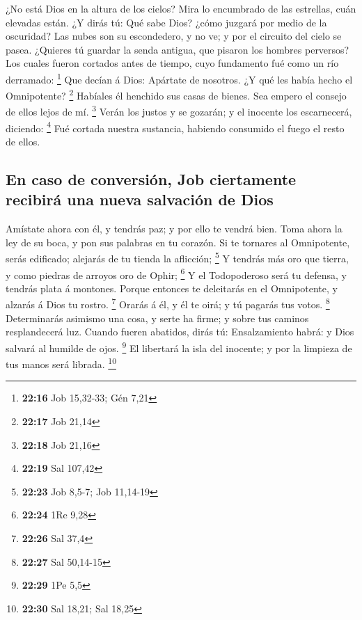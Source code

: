  ¿No está Dios en la altura de los cielos? Mira lo
encumbrado de las estrellas, cuán elevadas están.  ¿Y dirás
tú: Qué sabe Dios? ¿cómo juzgará por medio de la oscuridad?
 Las nubes son su escondedero, y no ve; y por el circuito
del cielo se pasea.  ¿Quieres tú guardar la senda antigua,
que pisaron los hombres perversos?  Los cuales fueron
cortados antes de tiempo, cuyo fundamento fué como un río derramado:
\footnote{\textbf{22:16} Job 15,32-33; Gén 7,21}  Que
decían á Dios: Apártate de nosotros. ¿Y qué les había hecho el
Omnipotente? \footnote{\textbf{22:17} Job 21,14}  Habíales
él henchido sus casas de bienes. Sea empero el consejo de ellos lejos de
mí. \footnote{\textbf{22:18} Job 21,16}  Verán los justos y
se gozarán; y el inocente los escarnecerá, diciendo: \footnote{\textbf{22:19}
  Sal 107,42}  Fué cortada nuestra sustancia, habiendo
consumido el fuego el resto de ellos.

\hypertarget{en-caso-de-conversiuxf3n-job-ciertamente-recibiruxe1-una-nueva-salvaciuxf3n-de-dios}{%
\subsection{En caso de conversión, Job ciertamente recibirá una nueva
salvación de
Dios}\label{en-caso-de-conversiuxf3n-job-ciertamente-recibiruxe1-una-nueva-salvaciuxf3n-de-dios}}

 Amístate ahora con él, y tendrás paz; y por ello te vendrá
bien.  Toma ahora la ley de su boca, y pon sus palabras en
tu corazón.  Si te tornares al Omnipotente, serás
edificado; alejarás de tu tienda la aflicción; \footnote{\textbf{22:23}
  Job 8,5-7; Job 11,14-19}  Y tendrás más oro que tierra, y
como piedras de arroyos oro de Ophir; \footnote{\textbf{22:24} 1Re 9,28}
 Y el Todopoderoso será tu defensa, y tendrás plata á
montones.  Porque entonces te deleitarás en el Omnipotente,
y alzarás á Dios tu rostro. \footnote{\textbf{22:26} Sal 37,4}
 Orarás á él, y él te oirá; y tú pagarás tus votos.
\footnote{\textbf{22:27} Sal 50,14-15}  Determinarás
asimismo una cosa, y serte ha firme; y sobre tus caminos resplandecerá
luz.  Cuando fueren abatidos, dirás tú: Ensalzamiento
habrá: y Dios salvará al humilde de ojos. \footnote{\textbf{22:29} 1Pe
  5,5}  El libertará la isla del inocente; y por la
limpieza de tus manos será librada. \footnote{\textbf{22:30} Sal 18,21;
  Sal 18,25}

